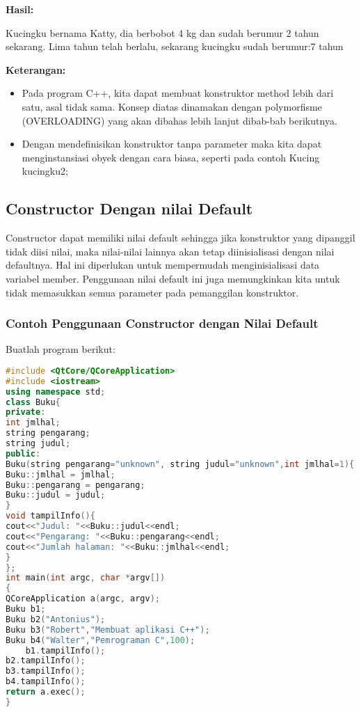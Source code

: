\textbf{Hasil:}

\begin{lcverbatim}
Kucingku bernama Katty, dia berbobot 4 kg dan 
sudah berumur 2 tahun sekarang.
Lima tahun telah berlalu, sekarang kucingku 
sudah berumur:7 tahun
\end{lcverbatim}

\textbf{Keterangan:}

\begin{itemize}

\item
  Pada program C++, kita dapat membuat konstruktor method lebih dari
  satu, asal tidak sama. Konsep diatas dinamakan dengan polymorfisme
  (OVERLOADING) yang akan dibahas lebih lanjut dibab-bab berikutnya.
\item
  Dengan mendefinisikan konstruktor tanpa parameter maka kita dapat
  menginstansiasi obyek dengan cara biasa, seperti pada contoh Kucing
  kucingku2;
\end{itemize}

\subsection{Constructor Dengan nilai
Default}\label{constructor-dengan-nilai-default}

Constructor dapat memiliki nilai default sehingga jika konstruktor yang
dipanggil tidak diisi nilai, maka nilai-nilai lainnya akan tetap
diinisialisasi dengan nilai defaultnya. Hal ini diperlukan untuk
mempermudah menginisialisasi data variabel member. Penggunaan nilai
default ini juga memungkinkan kita untuk tidak memasukkan semua
parameter pada pemanggilan konstruktor.

\subsubsection*{Contoh  Penggunaan Constructor dengan Nilai Default}

Buatlah program berikut:

\begin{lstlisting}[language=c++, caption=Penggunaan Constructor dengan Nilai Default, label=contoh6-10]
#include <QtCore/QCoreApplication>
#include <iostream>
using namespace std;
class Buku{
private:
int jmlhal;
string pengarang;
string judul;
public:
Buku(string pengarang="unknown", string judul="unknown",int jmlhal=1){
Buku::jmlhal = jmlhal;
Buku::pengarang = pengarang;
Buku::judul = judul;
}
void tampilInfo(){
cout<<"Judul: "<<Buku::judul<<endl;
cout<<"Pengarang: "<<Buku::pengarang<<endl;
cout<<"Jumlah halaman: "<<Buku::jmlhal<<endl;
}
};
int main(int argc, char *argv[])
{
QCoreApplication a(argc, argv);
Buku b1;
Buku b2("Antonius");
Buku b3("Robert","Membuat aplikasi C++");
Buku b4("Walter","Pemrograman C",100);
    b1.tampilInfo();
b2.tampilInfo();
b3.tampilInfo();
b4.tampilInfo();
return a.exec();
}
\end{lstlisting}

